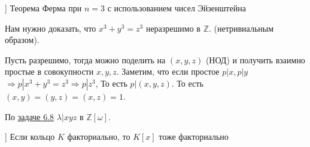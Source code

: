

\date{}



\begin{problem}[1{(d1)}[Каргальцев]]
Теорема Ферма при $n = 3$ с использованием чисел
Эйзенштейна

Нам нужно доказать, что $x^3 + y^3 = z^3$ неразрешимо в $\mathbb{Z}$.
(нетривиальным образом).
\end{problem}

\begin{solution}
Пусть разрешимо, тогда можно поделить на \((x, y, z)\) (НОД) и получить взаимно простые в совокупности \(x, y, z\). Заметим, что если простое \(p | x, p | y\) \(\Rightarrow p | x^3 + y^3 = z^3 \Rightarrow p | z^3\), То есть \(p | (x, y, z)\). То есть \((x, y) = (y, z) = (x, z) = 1\).

По \hyperlink{6.8}{задаче 6.8} \(\lambda | xyz\) в \(\mathbb{Z}[\omega]\).
\end{solution}

\begin{problem}[5 [Каргальцев]]
Если кольцо $K$ факториально, то $K[x]$ тоже факториально
\end{problem}

